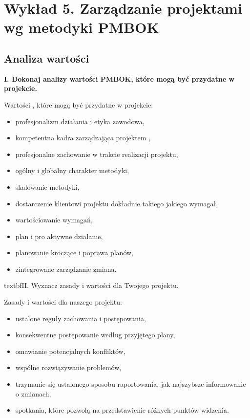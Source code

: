 ﻿\chapter{Wykład 5. Zarządzanie projektami wg metodyki PMBOK}

\section{Analiza wartości}
\textbf{I. Dokonaj analizy wartości PMBOK, które mogą być przydatne w projekcie.}

Wartości , które mogą być przydatne w projekcie:
\begin{itemize}
\item profesjonalizm działania i etyka zawodowa, 
\item kompetentna kadra zarządzająca projektem ,
\item profesjonalne zachowanie w trakcie realizacji projektu,
\item ogólny i globalny charakter metodyki,
\item skalowanie metodyki, 
\item dostarczenie klientowi projektu dokładnie takiego jakiego wymagał,
\item wartościowanie wymagań,
\item plan i pro aktywne działanie,
\item planowanie kroczące i poprawa planów,
\item zintegrowane zarządzanie zmianą. 
\end{itemize}

textbf{II. Wyznacz zasady i wartości dla Twojego projektu.}

Zasady i wartości dla naszego projektu:
\begin{itemize}
\item ustalone reguły zachowania i postępowania,
\item konsekwentne postępowanie według przyjętego plany,
\item omawianie potencjalnych konfliktów,
\item wspólne rozwiązywanie problemów,
\item trzymanie się ustalonego sposobu raportowania, jak najszybsze informowanie o zmianach,
\item spotkania, które pozwolą na przedstawienie różnych punktów widzenia.
\end{itemize}


